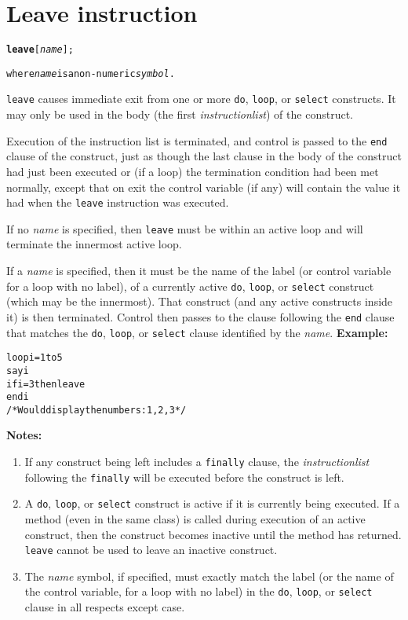 \chapter{Leave instruction}\label{refleave}
\index{,}
\begin{shaded}
\begin{alltt}
\textbf{leave} [\emph{name}];

where \emph{name} is a non-numeric \emph{symbol}.
\end{alltt}
\end{shaded}
 \texttt{leave} causes immediate exit from one or more \texttt{do},
\texttt{loop}, or \texttt{select} constructs.
It may only be used in the body (the first \emph{instructionlist})
of the construct.
 
Execution of the instruction list is terminated, and control is
passed to the \texttt{end} clause of the construct, just as though the
last clause in the body of the construct had just been executed or (if
a loop) the termination condition had been met normally, except that on
exit the control variable (if any) will contain the value it had when
the \texttt{leave} instruction was executed.
 
If no \emph{name} is specified, then \texttt{leave} must be
within an active loop and will terminate the innermost active loop.
 
If a \emph{name} is specified, then it must be the name of the
label (or control variable for a loop with no label), of a currently
active \texttt{do}, \texttt{loop}, or \texttt{select} construct
(which may be the innermost).  That construct (and any active constructs
inside it) is then terminated.  Control then passes to the clause
following the \texttt{end} clause that matches the
\texttt{do}, \texttt{loop}, or \texttt{select} clause identified by the
\emph{name}.
 \textbf{Example:}
\begin{alltt}
loop i=1 to 5
  say i
  if i=3 then leave
  end i
/* Would display the numbers:  1, 2, 3  */
\end{alltt}
 \textbf{Notes:}
\begin{enumerate}
\item If any construct being left includes a \texttt{finally} clause, the
\emph{instructionlist} following the \texttt{finally} will be
executed before the construct is left.
\item 
A \texttt{do}, \texttt{loop}, or \texttt{select} construct
is active if it is currently being executed.
If a method (even in the same class) is called during execution of an
active construct, then the construct becomes inactive until the method
has returned.
\texttt{leave} cannot be used to leave an inactive construct.
\item The \emph{name} symbol, if specified, must exactly match the
label (or the name of the control variable, for a loop with no label) in
the \texttt{do}, \texttt{loop}, or \texttt{select} clause in all
respects except case.
\end{enumerate}
